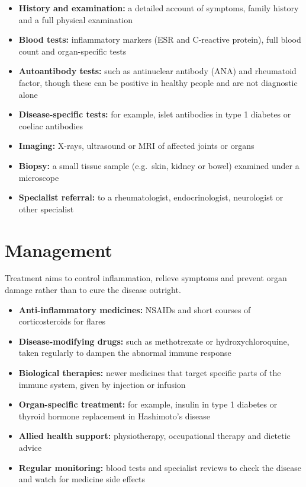 \begin{itemize}
    \item \textbf{History and examination:} a detailed account of symptoms, family history and a full physical examination
    \item \textbf{Blood tests:} inflammatory markers (ESR and C-reactive protein), full blood count and organ-specific tests
    \item \textbf{Autoantibody tests:} such as antinuclear antibody (ANA) and rheumatoid factor, though these can be positive in healthy people and are not diagnostic alone
    \item \textbf{Disease-specific tests:} for example, islet antibodies in type 1 diabetes or coeliac antibodies
    \item \textbf{Imaging:} X-rays, ultrasound or MRI of affected joints or organs
    \item \textbf{Biopsy:} a small tissue sample (e.g.\ skin, kidney or bowel) examined under a microscope
    \item \textbf{Specialist referral:} to a rheumatologist, endocrinologist, neurologist or other specialist
\end{itemize}

\section*{Management}
Treatment aims to control inflammation, relieve symptoms and prevent organ damage rather than to cure the disease outright.

\begin{itemize}
    \item \textbf{Anti-inflammatory medicines:} NSAIDs and short courses of corticosteroids for flares
    \item \textbf{Disease-modifying drugs:} such as methotrexate or hydroxychloroquine, taken regularly to dampen the abnormal immune response
    \item \textbf{Biological therapies:} newer medicines that target specific parts of the immune system, given by injection or infusion
    \item \textbf{Organ-specific treatment:} for example, insulin in type 1 diabetes or thyroid hormone replacement in Hashimoto's disease
    \item \textbf{Allied health support:} physiotherapy, occupational therapy and dietetic advice
    \item \textbf{Regular monitoring:} blood tests and specialist reviews to check the disease and watch for medicine side effects
\end{itemize}

